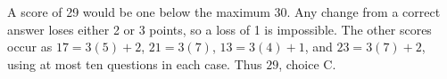 A score of 29 would be one below the maximum 30. Any change from a correct answer loses either 2 or 3 points, so a loss of 1 is impossible. The other scores occur as $17=3(5)+2$, $21=3(7)$, $13=3(4)+1$, and $23=3(7)+2$, using at most ten questions in each case. Thus $\boxed{29}$, choice C.
